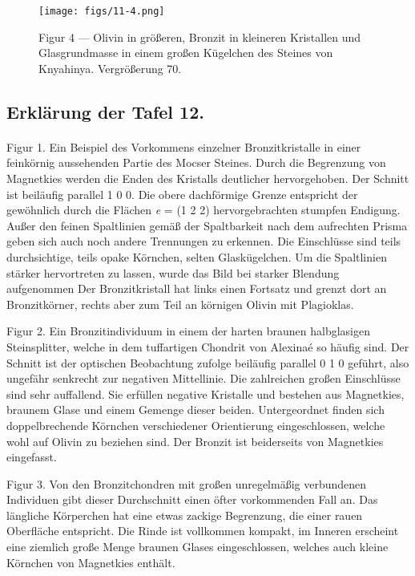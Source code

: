 \documentclass[a4paper, 11pt, oneside, polutonikogreek, german]{article}
\begin{document}
\vspace*{\fill}
\begin{figure}[H]
\centering
\texttt{[image: figs/11-4.png]}
\caption{\small Figur 4 --- Olivin in größeren, Bronzit in kleineren Kristallen und Glasgrundmasse in einem großen Kügelchen des Steines von Knyahinya. Vergrößerung 70.}
\end{figure}
\vspace*{\fill}
\clearpage

\subsection{Erklärung der Tafel 12.}
\paragraph{}
Figur 1. Ein Beispiel des Vorkommens einzelner Bronzitkristalle in einer feinkörnig aussehenden Partie des Mocser Steines. Durch die Begrenzung von Magnetkies werden die Enden des Kristalls deutlicher hervorgehoben. Der Schnitt ist beiläufig parallel 1 0 0. Die obere dachförmige Grenze entspricht der gewöhnlich durch die Flächen \emph{e} = (1 2 2) hervorgebrachten stumpfen Endigung. Außer den feinen Spaltlinien gemäß der Spaltbarkeit nach dem aufrechten Prisma geben sich auch noch andere Trennungen zu erkennen. Die Einschlüsse sind teils durchsichtige, teils opake Körnchen, selten Glaskügelchen. Um die Spaltlinien stärker hervortreten zu lassen, wurde das Bild bei starker Blendung aufgenommen Der Bronzitkristall hat links einen Fortsatz und grenzt dort an Bronzitkörner, rechts aber zum Teil an körnigen Olivin mit Plagioklas.

Figur 2. Ein Bronzitindividuum in einem der harten braunen halbglasigen Steinsplitter, welche in dem tuffartigen Chondrit von Alexinaé so häufig sind. Der Schnitt ist der optischen Beobachtung zufolge beiläufig parallel 0 1 0 geführt, also ungefähr senkrecht zur negativen Mittellinie. Die zahlreichen großen Einschlüsse sind sehr auffallend. Sie erfüllen negative Kristalle und bestehen aus Magnetkies, braunem Glase und einem Gemenge dieser beiden. Untergeordnet finden sich doppelbrechende Körnchen verschiedener Orientierung eingeschlossen, welche wohl auf Olivin zu beziehen sind. Der Bronzit ist beiderseits von Magnetkies eingefasst.

Figur 3. Von den Bronzitchondren mit großen unregelmäßig verbundenen Individuen gibt dieser Durchschnitt einen öfter vorkommenden Fall an. Das längliche Körperchen hat eine etwas zackige Begrenzung, die einer rauen Oberfläche entspricht. Die Rinde ist vollkommen kompakt, im Inneren erscheint eine ziemlich große Menge braunen Glases eingeschlossen, welches auch kleine Körnchen von Magnetkies enthält.
\end{document}
